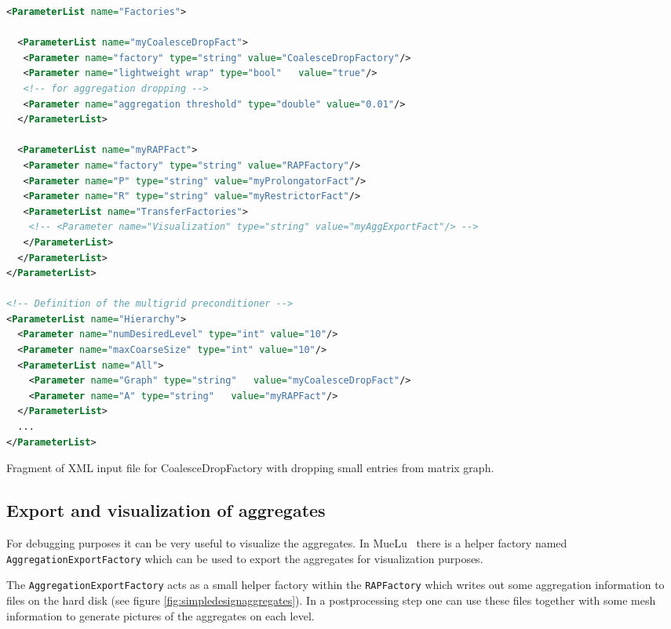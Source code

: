 \documentclass[12pt,a4paper]{article}
\newcommand{\MueLu}{MueLu}
\begin{document}
\begin{Listing}
\begin{center}
\begin{lstlisting}[language=xml]
<ParameterList name="Factories">

  <ParameterList name="myCoalesceDropFact">
   <Parameter name="factory" type="string" value="CoalesceDropFactory"/>
   <Parameter name="lightweight wrap" type="bool"   value="true"/>
   <!-- for aggregation dropping -->
   <Parameter name="aggregation threshold" type="double" value="0.01"/>
  </ParameterList>
       
  <ParameterList name="myRAPFact">
   <Parameter name="factory" type="string" value="RAPFactory"/>
   <Parameter name="P" type="string" value="myProlongatorFact"/>
   <Parameter name="R" type="string" value="myRestrictorFact"/>
   <ParameterList name="TransferFactories">
    <!-- <Parameter name="Visualization" type="string" value="myAggExportFact"/> -->
   </ParameterList>
  </ParameterList>  
</ParameterList>

<!-- Definition of the multigrid preconditioner -->
<ParameterList name="Hierarchy">
  <Parameter name="numDesiredLevel" type="int" value="10"/> 
  <Parameter name="maxCoarseSize" type="int" value="10"/>
  <ParameterList name="All">
    <Parameter name="Graph" type="string"   value="myCoalesceDropFact"/>
    <Parameter name="A" type="string"   value="myRAPFact"/>
  </ParameterList>
  ...
</ParameterList>
\end{lstlisting}
\caption{Fragment of XML input file for CoalesceDropFactory with dropping small entries from matrix graph.} 
\label{listing:CoalesceDropFactory}
\end{center}
\end{Listing}

\subsection{Export and visualization of aggregates}
For debugging purposes it can be very useful to visualize the aggregates. In \MueLu~ there is a helper factory named \verb|AggregationExportFactory| which can be used to export the aggregates for visualization purposes. 

The \verb|AggregationExportFactory| acts as a small helper factory within the \verb|RAPFactory| which writes out some aggregation information to files on the hard disk (see figure \ref{fig:simpledesignaggregates}). In a postprocessing step one can use these files together with some mesh information to generate pictures of the aggregates on each level. 
\end{document}
